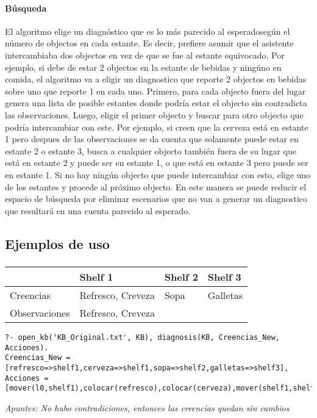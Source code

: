 \documentclass[11pt,fleqn]{article}
\begin{document}
\paragraph{Búsqueda} El algoritmo elige un diagnóstico que es lo más parecido al esperadosegún el número de objectos en cada estante. Es decir, prefiere asumir que el asistente intercambiaba dos objectos en vez de que se fue al estante equivocado. Por ejemplo, si debe de estar 2 objectos en la estante de bebidas y ningúno en comida, el algoritmo va a eligir un diagnostico que reporte 2 objectos en bebidas sobre uno que reporte 1 en cada uno. Primero, para cada objecto fuera del lugar genera una lista de posible estantes donde podría estar el objecto sin contradicta las observaciones. Luego, eligir el primer objecto y buscar para otro objecto que podría intercambiar con este. Por ejemplo, si creen que la cerveza está en estante 1 pero despues de las observaciones se da cuenta que solamente puede estar en estante 2 o estante 3, busca a cualquier objecto también fuera de su lugar que está en estante 2 y puede ser en estante 1, o que está en estante 3 pero puede ser en estante 1. Si no hay ningún objecto que puede intercambiar con esto, elige uno de los estantes y procede al próximo objecto. En este manera se puede reducir el espacio de búsqueda por eliminar escenarios que no van a generar un diagnostico que resultará en una cuenta parecido al esperado.
\subsection*{Ejemplos de uso}

\subsubsection{}
	\begin{tabular}{| l | l | l | l |}
		\hline
						& Shelf 1 & Shelf 2 & Shelf 3 \\ \hline
		Creencias		& Refresco, Creveza & Sopa & Galletas \\ \hline
		Observaciones	& Refresco, Creveza & & \\
		\hline
	\end{tabular}
	\begin{lstlisting}
?- open_kb('KB_Original.txt', KB), diagnosis(KB, Creencias_New, Acciones).
Creencias_New = [refresco=>shelf1,cerveza=>shelf1,sopa=>shelf2,galletas=>shelf3],
Acciones = [mover(l0,shelf1),colocar(refresco),colocar(cerveza),mover(shelf1,shelf2),colocar(sopa),mover(shelf2,shelf3),colocar(galletas)],
	\end{lstlisting}
	\textit{Apuntes: No hubo contradiciones, entonces las creencias quedan sin cambios} \\
\end{document}
